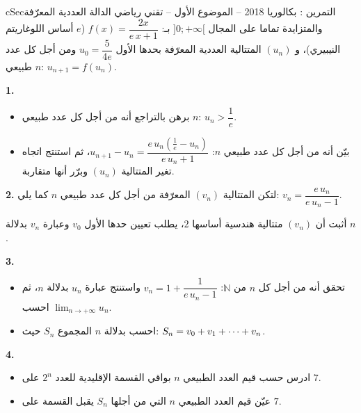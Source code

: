 \documentclass[12pt,a4paper]{article}
\newenvironment{BOX}[2]{\begin{otherlanguage}{english}\begin{arbox}{#1}{#2}}{\end{arbox}\end{otherlanguage}}
\newcounter{exo}
\newenvironment{tamrin}[1]{\stepcounter{exo}\begin{BOX}{cSec}{التمرين \theexo: #1}}{\end{BOX}}
\renewcommand{\cdots}{\mathinner{\cdotp\cdotp\cdotp}}
\newcommand{\N}{\mathbb{N}}
\newcommand{\limn}{\displaystyle\lim_{n\to+\infty}}
\newenvironment{sq}{\begin{itemize}[leftmargin=2.4em,itemsep=3pt]}{\end{itemize}}
\newcommand{\qa}{\item[(أ)]}\newcommand{\qb}{\item[(ب)]}\newcommand{\qc}{\item[(جـ)]}\newcommand{\qd}{\item[(د)]}\newcommand{\qe}{\item[(هـ)]}
\newcommand{\QQ}[1]{\par\smallskip\textbf{#1.} }
\begin{document}
\begin{tamrin}{بكالوريا 2018 -- الموضوع الأول -- تقني رياضي}
الدالة العددية المعرّفة والمتزايدة تماما على المجال $]0;+\infty[$ بـ: $f(x)=\dfrac{2x}{e\,x+1}$ ($e$ أساس اللوغاريتم النيبيري)،
و $(u_n)$ المتتالية العددية المعرّفة بحدها الأول $u_0=\dfrac{5}{4e}$ ومن أجل كل عدد طبيعي $n$: $u_{n+1}=f(u_n)$.

\QQ{1}
\begin{sq}
\qa برهن بالتراجع أنه من أجل كل عدد طبيعي $n$: $u_n>\dfrac1e$.
\qb بيّن أنه من أجل كل عدد طبيعي $n$: $u_{n+1}-u_n=\dfrac{e\,u_n\left(\frac1e-u_n\right)}{e\,u_n+1}$، ثم استنتج اتجاه تغير المتتالية $(u_n)$ وبرّر أنها متقاربة.
\end{sq}

\QQ{2} لتكن المتتالية $(v_n)$ المعرّفة من أجل كل عدد طبيعي $n$ كما يلي: $v_n=\dfrac{e\,u_n}{e\,u_n-1}$.

أثبت أن $(v_n)$ متتالية هندسية أساسها $2$، يطلب تعيين حدها الأول $v_0$ وعبارة $v_n$ بدلالة $n$.

\QQ{3}
\begin{sq}
\qa تحقق أنه من أجل كل $n$ من $\N$: $v_n=1+\dfrac{1}{e\,u_n-1}$ واستنتج عبارة $u_n$ بدلالة $n$، ثم احسب $\limn u_n$.
\qb احسب بدلالة $n$ المجموع $S_n$ حيث: $S_n=v_0+v_1+\cdots+v_n$.
\end{sq}

\QQ{4}
\begin{sq}
\qa ادرس حسب قيم العدد الطبيعي $n$ بواقي القسمة الإقليدية للعدد $2^n$ على $7$.
\qb عيّن قيم العدد الطبيعي $n$ التي من أجلها $S_n$ يقبل القسمة على $7$.
\end{sq}
\end{tamrin}
\end{document}
